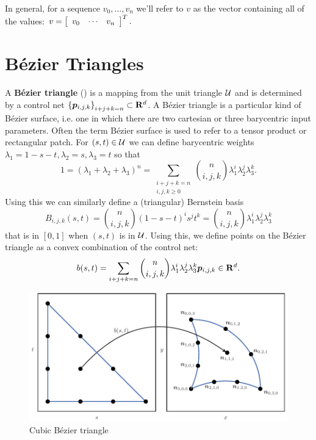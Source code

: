 In general, for a sequence \(v_0, \ldots, v_n\) we'll refer to \(v\)
as the vector containing all of the values:
\(v = \left[\begin{array}{c c c} v_0 & \cdots &
    v_n\end{array}\right]^T.\)

\section{B\'{e}zier Triangles}

A \textbf{B\'{e}zier triangle} (\cite[Chapter~17]{Farin2001}) is a
mapping from the unit triangle
\(\mathcal{U}\) and is determined by a control net
\(\left\{\bm{p}_{i, j, k}\right\}_{i + j + k = n} \subset \mathbf{R}^d\).
A B\'{e}zier triangle is a particular kind of B\'{e}zier surface, i.e. one
in which there are two cartesian or three barycentric input parameters.
Often the term B\'{e}zier surface is used to refer to a tensor product or
rectangular patch.
For \((s, t) \in \mathcal{U}\) we can define barycentric weights
\(\lambda_1 = 1 - s - t, \lambda_2 = s, \lambda_3 = t\) so that
\begin{equation}
1 = \left(\lambda_1 + \lambda_2 + \lambda_3\right)^n =
  \sum_{\substack{i + j + k = n \\ i, j, k \geq 0}} \binom{n}{i, j, k}
  \lambda_1^i \lambda_2^j \lambda_3^k.
\end{equation}
Using this we can similarly define a (triangular) Bernstein basis
\begin{equation}
B_{i, j, k}(s, t) = \binom{n}{i, j, k} (1 - s - t)^i s^j t^k
  = \binom{n}{i, j, k} \lambda_1^i \lambda_2^j \lambda_3^k
\end{equation}
that is in \(\left[0, 1\right]\) when \((s, t)\) is in \(\mathcal{U}\).
Using this, we define points on the B\'{e}zier triangle as a
convex combination of the control net:
\begin{equation}
b(s, t) = \sum_{i + j + k = n} \binom{n}{i, j, k}
  \lambda_1^i \lambda_2^j \lambda_3^k
  \bm{p}_{i, j, k} \in \mathbf{R}^d.
\end{equation}

\begin{figure}
  \includegraphics{../images/preliminaries/main_figure01.pdf}
  \centering
  \captionsetup{width=.75\linewidth}
  \caption{Cubic B\'{e}zier triangle}
  \label{fig:cubic-bezier-example}
\end{figure}


